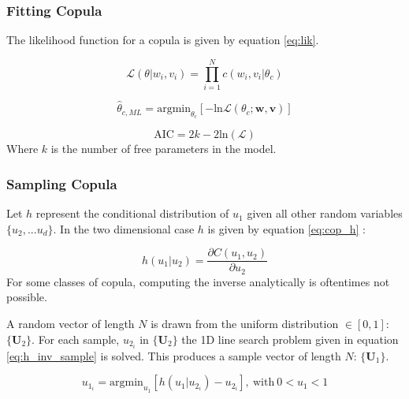 \documentclass[t, pdftex]{beamer}
\begin{document}
\begin{frame}
\frametitle{Fitting Copula}
The likelihood function for a copula is given by equation \ref{eq:lik}. 

\begin{equation}
\mathcal{L}(\theta|w_i, v_i)= \prod_{i=1}^N c(w_i, v_i|\theta_c)
\label{eq:lik}
\end{equation}

\begin{equation}
\hat \theta_{c,ML} = \mathrm{argmin}_{\theta_c}[-\mathrm{ln}\mathcal{L}(\theta_{c} ; \mathbf w, \mathbf v)]
\label{eq:nlog_lik}
\end{equation}


\begin{equation}
\mathrm{AIC} = 2k - 2\mathrm{ln}(\mathcal{L})
\label{eq:cop_aic}
\end{equation}
Where $k$ is the number of free parameters in the model. 

\end{frame}

\begin{frame}
\frametitle{Sampling Copula}
Let $h$ represent the conditional distribution of $u_1$ given all other random variables $\{u_2, ... u_d\}$.  In the two dimensional case $h$ is given by equation \ref{eq:cop_h} \cite{Nelsen2006}:

\begin{equation}
h(u_1 | u_2) = \frac{\partial C(u_1, u_2)}{\partial u_2}
\label{eq:cop_h}
\end{equation}
For some classes of copula, computing the inverse analytically is oftentimes not possible.

A random vector of length $N$ is drawn from the uniform distribution $\in [0, 1]$:  $\{\mathbf U_2\}$.  For each sample, $u_{2_i}$ in $\{\mathbf U_2\}$ the 1D line search problem given in equation \ref{eq:h_inv_sample} is solved.  This produces a sample vector of length $N$: $\{\mathbf U_1\}$.

\begin{equation}
u_{1_i} = \mathrm{argmin}_{u_1} \left[ h(u_1|u_{2_i}) - u_{2_i} \right],\ \mathrm{with}\ 0 < u_1 < 1
\label{eq:h_inv_sample}
\end{equation}
\end{frame}
\end{document}
